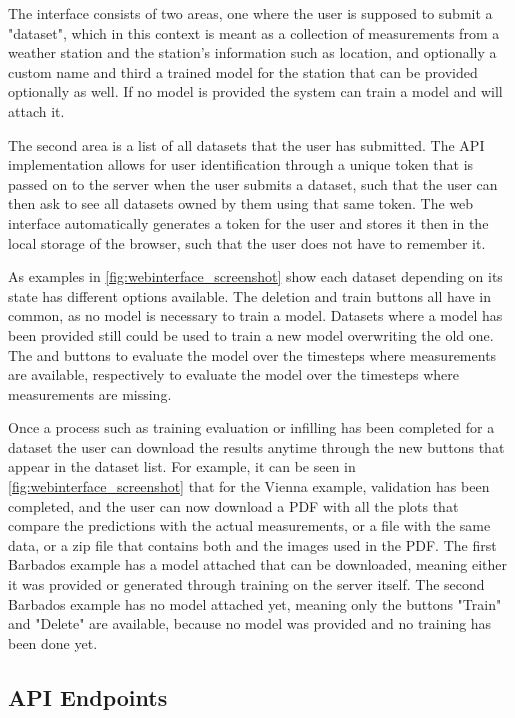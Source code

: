 The interface consists of two areas, one where the user is supposed to submit a "dataset", which in this context is meant as a collection of measurements from a weather station and the station's information such as location, and optionally a custom name and third a trained model for the station that can be provided optionally as well. If no model is provided the system can train a model and will attach it. 

The second area is a list of all datasets that the user has submitted. The API implementation allows for user identification through a unique token that is passed on to the server when the user submits a dataset, such that the user can then ask to see all datasets owned by them using that same token. The web interface automatically generates a token for the user and stores it then in the local storage of the browser, such that the user does not have to remember it.

As examples in \autoref{fig:webinterface_screenshot} show each dataset depending on its state has different options available. The deletion and train buttons all have in common, as no model is necessary to train a model. Datasets where a model has been provided still could be used to train a new model overwriting the old one. The  and  buttons to evaluate the model over the timesteps where measurements are available, respectively to evaluate the model over the timesteps where measurements are missing.

Once a process such as training evaluation or infilling has been completed for a dataset the user can download the results anytime through the new buttons that appear in the dataset list. For example, it can be seen in \autoref{fig:webinterface_screenshot} that for the Vienna example, validation has been completed, and the user can now download a PDF with all the plots that compare the predictions with the actual measurements, or a  file with the same data, or a zip file that contains both and the images used in the PDF. The first Barbados example has a model attached that can be downloaded, meaning either it was provided or generated through training on the server itself. The second Barbados example has no model attached yet, meaning only the buttons "Train" and "Delete" are available, because no model was provided and no training has been done yet. 


\subsection{API Endpoints}
\label{sec:api}

